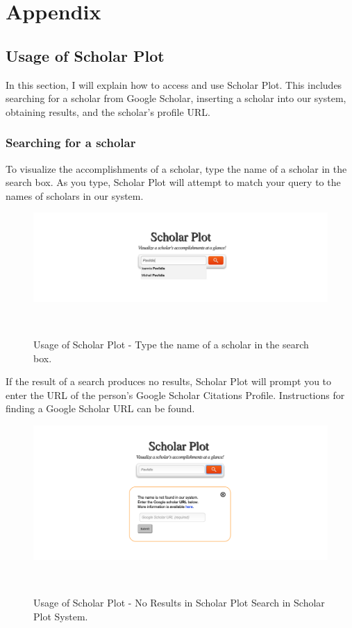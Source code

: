 \chapter{Appendix}


\section{Usage of Scholar Plot}
In this section, I will explain how to access and use Scholar Plot. This includes searching for a scholar from Google Scholar, inserting a scholar into our system, obtaining results, and the scholar's profile URL.

\subsection{Searching for a scholar}
To visualize the accomplishments of a scholar, type the name of a scholar in the search box. As you type, Scholar Plot will attempt to match your query to the names of scholars in our system.

\begin{figure}[hb]
  \centering
  \includegraphics[width=1\textwidth]{figures/Support-3}
  \caption{Usage of Scholar Plot - Type the name of a scholar in the search box.}~\label{fig:Support-3}
\end{figure}

If the result of a search produces no results, Scholar Plot will prompt you to enter the URL of the person's Google Scholar Citations Profile. Instructions for finding a Google Scholar URL can be found.


\begin{figure}
  \centering
  \includegraphics[width=1\textwidth]{figures/Support-4}
  \caption{Usage of Scholar Plot - No Results in Scholar Plot Search in Scholar Plot System.}~\label{fig:Support-4}
\end{figure}




